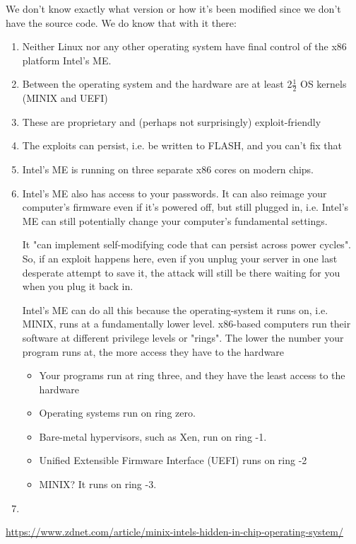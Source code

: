 We don't know exactly what version or how it's been modified since we don't have
the source code. We do know that with it there:
\begin{enumerate}
  \item  Neither Linux nor any other operating system have final control of the x86 platform Intel's ME.
  
  \item Between the operating system and the hardware are at least 2$\frac{1}{2}$ OS kernels (MINIX and UEFI)
  
  \item These are proprietary and (perhaps not surprisingly) exploit-friendly

  \item The exploits can persist, i.e. be written to FLASH, and you can't fix that
  
  \item Intel's ME is running on three separate x86 cores on modern chips. 
  
  \item Intel's ME also has access to your passwords. It can also reimage your
  computer's firmware even if it's powered off, but still plugged in, i.e. Intel's ME can
  still potentially change your computer's fundamental settings.
  
  It "can implement self-modifying code that can persist across power cycles".
  So, if an exploit happens here, even if you unplug your server in one last
  desperate attempt to save it, the attack will still be there waiting for you
  when you plug it back in.
  
  Intel's ME can do all this because the operating-system it runs on, i.e.
  MINIX, runs at a fundamentally lower level.
  x86-based computers run their software at different privilege levels or
  "rings".
  The lower the number your program runs at, the more access they have to the
  hardware
  \begin{itemize}
    \item  Your programs run at ring three, and they have the least access to the hardware
    
    \item Operating systems run on ring zero. 
    
    \item Bare-metal hypervisors, such as Xen, run on ring -1.
    
    \item  Unified Extensible Firmware Interface (UEFI) runs on ring -2
    
    \item MINIX? It runs on ring -3.
  \end{itemize}
  
  
  \item 
\end{enumerate}
\url{https://www.zdnet.com/article/minix-intels-hidden-in-chip-operating-system/}

